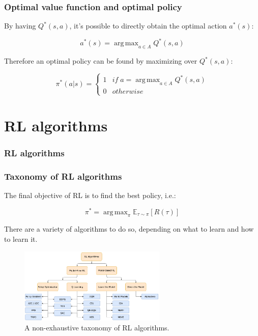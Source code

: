 \documentclass[9pt]{beamer}
\newcommand{\E}{{\mathbb E}}
\DeclareMathOperator*{\argmax}{arg\,max}
\begin{document}
\begin{frame}
	\frametitle{Optimal value function and optimal policy }
	By having $Q^*(s,a)$, it's possible to directly obtain the optimal action $a^*(s)$:

	\begin{equation}
		a^*(s) = \argmax_{a \in A} Q^* (s,a)
	\end{equation}

	Therefore an optimal policy can be found by maximizing over $Q^*(s,a)$:

	\begin{equation}
		\pi^*(a|s) = 
		\begin{cases}
			1 & if \; a = \argmax_{a \in A} Q^*(s,a)\\
			0 & otherwise
		\end{cases}
		\label{eq:opt-policy}
	\end{equation}

\end{frame}


\section{RL algorithms}


\begin{frame}
	\frametitle{RL algorithms}
	
	\tableofcontents[ 
	currentsubsection, 
	hideothersubsections, 
	sectionstyle=show/shaded,
	]
	
\end{frame}


\begin{frame}
	\frametitle{Taxonomy of RL algorithms}
	The final objective of RL is to find the best policy, i.e.:

	\begin{equation}
		\pi^* = \argmax_\pi \E_{\tau \sim \pi}{[R(\tau)]}
		\label{eq:objective}
	\end{equation}
	

	There are a variety of algorithms to do so, depending on what to learn and how to learn it.

	\begin{figure}[h]
		\centering
		\includegraphics[width=7cm]{rl-taxonomy.png}
		\caption{A non-exhaustive taxonomy of RL algorithms.\cite{SpinningUp2018}}
		\label{fig:rl-taxonomy}
	\end{figure}

\end{frame}
\end{document}
